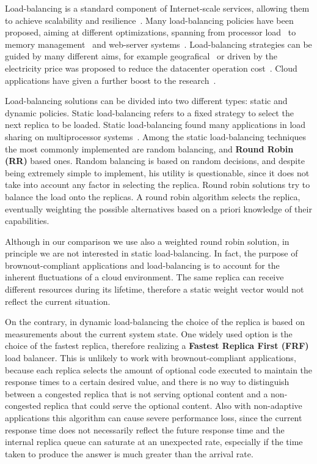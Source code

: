 Load-balancing is a standard component of Internet-scale services,
allowing them to achieve scalability and
resilience~\citep{Barroso09,Hamilton07:LISA,clusteredbalancing}.  Many
load-balancing policies have been proposed, aiming at different
optimizations, spanning from processor load~\cite{Stankovic:TC} to
memory management~\cite{PattersonMemoryLB,MemoryLBACC} and web-server
systems~\cite{Cardellini2003}. Load-balancing strategies can be guided
by many different aims, for example
geografical~\cite{GeograficalSASO,geographicalwanbalancing} or driven
by the electricity price was proposed to reduce the datacenter
operation cost~\cite{LoadBalancingForElectricity:TCC}. Cloud
applications have given a further boost to the
research~\citep{Barroso09,Lu11:PerfEval,Lin12:IGCC}.

Load-balancing solutions can be divided into two different types:
static and dynamic policies. Static load-balancing refers to a fixed
strategy to select the next replica to be loaded. Static
load-balancing found many applications in load sharing on
multiprocessor
systems~\cite{StaticLoadBalancing:TSE,StaticOptimal:ACM}. Among the
static load-balancing techniques the most commonly implemented are
random balancing, and \textbf{Round Robin (RR)} based ones. Random
balancing is based on random decisions, and despite being extremely
simple to implement, his utility is questionable, since it does not
take into account any factor in selecting the replica. Round robin
solutions try to balance the load onto the replicas. A round robin
algorithm selects the replica, eventually weighting the possible
alternatives based on a priori knowledge of their capabilities.

Although in our comparison we use also a weighted round robin
solution, in principle we are not interested in static
load-balancing. In fact, the purpose of brownout-compliant
applications and load-balancing is to account for the inherent
fluctuations of a cloud environment. The same replica can receive
different resources during its lifetime, therefore a static weight
vector would not reflect the current situation.

On the contrary, in dynamic load-balancing the choice of the replica
is based on measurements about the current system state. One widely
used option is the choice of the fastest replica, therefore realizing
a \textbf{Fastest Replica First (FRF)} load balancer. This is unlikely
to work with brownout-compliant applications, because each replica
selects the amount of optional code executed to maintain the response
times to a certain desired value, and there is no way to distinguish
between a congested replica that is not serving optional content and a
non-congested replica that could serve the optional content. Also with
non-adaptive applications this algorithm can cause severe performance
loss, since the current response time does not necessarily reflect the
future response time and the internal replica queue can saturate at an
unexpected rate, especially if the time taken to produce the answer is
much greater than the arrival rate.


